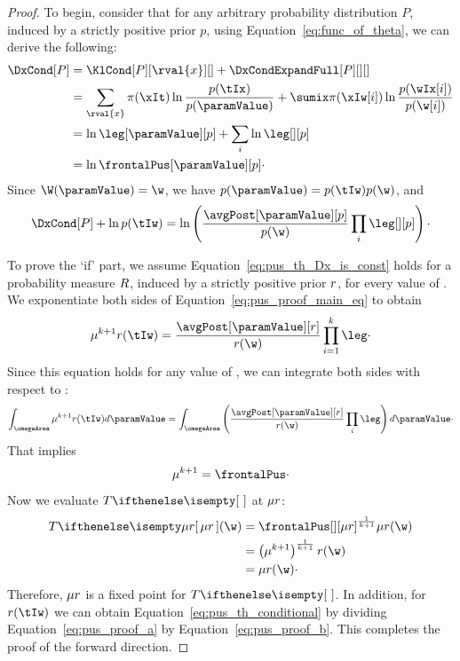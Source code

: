 \begin{proof}
    \newcommand{\someDist}{P}
    \newcommand{\somePrior}{p}
    To begin, consider that for any arbitrary probability distribution $\someDist$, induced by a strictly positive
    prior $\somePrior$, using Equation~\ref{eq:func_of_theta}, we can derive the following:
    \begin{align*}
        \DxCond[\someDist] &= \KlCond[\someDist][\rval{x}][ ] + \DxCondExpandFull[\someDist][][ ] \\
        &= \sum_{\rval{x}} \pi(\xIt) \ln \frac{\somePrior(\tIx)}{\somePrior(\paramValue)} +
        \sumix \pi(\xIw[i]) \ln \frac{\somePrior(\wIx[i])}{\somePrior(\w[i])}\\
        &= \ln \leg[\paramValue][\somePrior] + \sum_i \ln \leg[][\somePrior] \\
        &= \ln \frontalPus[\paramValue][\somePrior] \cdot
    \end{align*}
    Since $\W(\paramValue) = \w$, we have $\somePrior(\paramValue) = \somePrior(\tIw) \somePrior(\w)$, and
    \begin{equation}
        \label{eq:pus_proof_main_eq}
        \DxCond[\someDist] + \ln \somePrior(\tIw) =
        \ln \left(  \frac{\avgPost[\paramValue][\somePrior]}{\somePrior(\w)} \prod_i \leg[][\somePrior] \right) \cdot
    \end{equation}

    To prove the `if' part, we assume Equation~\ref{eq:pus_th_Dx_is_const} holds for a probability measure $R$,
    induced by a strictly positive prior $r$, for every value of \paramValue.
    We exponentiate both sides of Equation~\ref{eq:pus_proof_main_eq} to obtain
    \begin{equation}
        \normConst ^{k+1} \solPrior(\tIw) =\frac{\avgPost[\paramValue][\solPrior]}{\solPrior(\w)} \prod_{i=1}^k \leg \cdot
        \label{eq:pus_proof_a}
    \end{equation}
    Since this equation holds for any value of \paramValue, we can integrate both sides with respect to \paramValue:
    \[
        \int_{\omegaArea} \normConst ^{k+1} \solPrior(\tIw) d\paramValue =
        \int_{\omegaArea}
        \left( \frac{\avgPost[\paramValue][\solPrior]}{\solPrior(\w)} \prod_i \leg  \right) d\paramValue \cdot
    \]
    That implies
    \begin{equation}
        \normConst ^{k+1} = \frontalPus \cdot
        \label{eq:pus_proof_b}
    \end{equation}
    Now we evaluate $\fpMap{}$ at $\mu r$:
    \begin{align*}
        \fpMap{\fixedPoint}(\w) &= \frontalPus[][\fixedPoint] ^{\frac{1}{k+1}} \fixedPoint(\w) \\
        &= \left( \normConst^{k+1} \right)^{\frac{1}{k+1}} \solPrior(\w) \\
        &= \fixedPoint(\w) \cdot
    \end{align*}
    Therefore, $\mu r$ is a fixed point for $\fpMap{}$.
    In addition, for $\solPrior(\tIw)$ we can obtain Equation~\ref{eq:pus_th_conditional} by dividing
    Equation~\ref{eq:pus_proof_a} by Equation~\ref{eq:pus_proof_b}.
    This completes the proof of the forward direction.


\end{proof}
